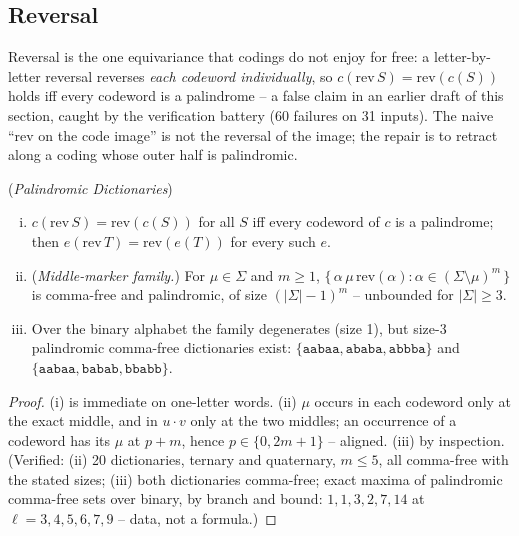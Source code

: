 \subsection{Reversal}

Reversal is the one equivariance that codings do not enjoy for free: a
letter-by-letter reversal reverses \emph{each codeword individually}, so
$c(\mathrm{rev}\,S) = \mathrm{rev}(c(S))$ holds iff every codeword is a
palindrome -- a false claim in an earlier draft of this section, caught by
the verification battery (60 failures on 31 inputs). The naive ``rev on the
code image'' is not the reversal of the image; the repair is to retract
along a coding whose outer half is palindromic.

\begin{lemma}
    (\emph{Palindromic Dictionaries})
    \label{lem:palindrome}
    \begin{enumerate}[(i)]
        \item $c(\mathrm{rev}\,S) = \mathrm{rev}(c(S))$ for all $S$ iff
        every codeword of $c$ is a palindrome; then
        $e(\mathrm{rev}\,T) = \mathrm{rev}(e(T))$ for every such $e$.
        \item (\emph{Middle-marker family.}) For $\mu \in \Sigma$ and
        $m \ge 1$, $\{\, \alpha\,\mu\,\mathrm{rev}(\alpha) : \alpha \in
        (\Sigma \setminus \mu)^m \,\}$ is comma-free and palindromic, of
        size $(|\Sigma|-1)^m$ -- unbounded for $|\Sigma| \ge 3$.
        \item Over the binary alphabet the family degenerates (size 1),
        but size-3 palindromic comma-free dictionaries exist:
        $\{\mathtt{aabaa}, \mathtt{ababa}, \mathtt{abbba}\}$ and
        $\{\mathtt{aabaa}, \mathtt{babab}, \mathtt{bbabb}\}$.
    \end{enumerate}
\end{lemma}

\begin{proof}
    (i) is immediate on one-letter words. (ii) $\mu$ occurs in each codeword
    only at the exact middle, and in $u \cdot v$ only at the two middles;
    an occurrence of a codeword has its $\mu$ at $p + m$, hence $p \in
    \{0, 2m+1\}$ -- aligned. (iii) by inspection. (Verified: (ii) 20
    dictionaries, ternary and quaternary, $m \le 5$, all comma-free with the
    stated sizes; (iii) both dictionaries comma-free; exact maxima of
    palindromic comma-free sets over binary, by branch and bound:
    $1, 1, 3, 2, 7, 14$ at $\ell = 3, 4, 5, 6, 7, 9$ -- data, not a
    formula.)
\end{proof}

